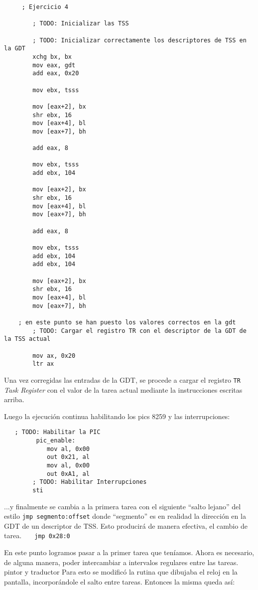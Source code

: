 \begin{verbatim}
     ; Ejercicio 4
    
        ; TODO: Inicializar las TSS
        
        ; TODO: Inicializar correctamente los descriptores de TSS en la GDT
        xchg bx, bx
        mov eax, gdt
        add eax, 0x20

        mov ebx, tsss
 
        mov [eax+2], bx
        shr ebx, 16
        mov [eax+4], bl
        mov [eax+7], bh

        add eax, 8 

        mov ebx, tsss
        add ebx, 104

        mov [eax+2], bx
        shr ebx, 16
        mov [eax+4], bl
        mov [eax+7], bh

        add eax, 8 

        mov ebx, tsss
        add ebx, 104
        add ebx, 104

        mov [eax+2], bx
        shr ebx, 16
        mov [eax+4], bl
        mov [eax+7], bh

	; en este punto se han puesto los valores correctos en la gdt
        ; TODO: Cargar el registro TR con el descriptor de la GDT de la TSS actual

        mov ax, 0x20
        ltr ax
\end{verbatim}

Una vez corregidas las entradas de la GDT, se procede a cargar el registro \texttt{TR} \emph{Task Register} con el valor de la tarea actual mediante la instrucciones escritas arriba.

Luego la ejecución continua habilitando los pics 8259 y las interrupciones:
\begin{verbatim}
   ; TODO: Habilitar la PIC
         pic_enable:
            mov al, 0x00
            out 0x21, al
            mov al, 0x00
            out 0xA1, al
        ; TODO: Habilitar Interrupciones
        sti
\end{verbatim}

...y finalmente se cambia a la primera tarea con el siguiente ``salto lejano'' del estilo \texttt{jmp segmento:offset} donde ``segmento'' es en realidad la dirección en la GDT de un descriptor de TSS. Esto producirá de manera efectiva, el cambio de tarea.
\verb=   jmp 0x28:0 =

En este punto logramos pasar a la primer tarea que teníamos. Ahora es necesario, de alguna manera, poder intercambiar a intervalos regulares entre las tareas. pintor y traductor Para esto se modificó la rutina que dibujaba el reloj en la pantalla, incorporándole el salto entre tareas. Entonces la misma queda así:

